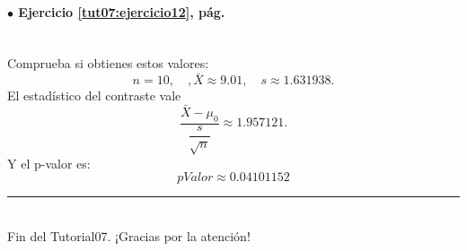 \documentclass[10pt,a4paper]{article}\usepackage[]{graphicx}\usepackage[]{color}
\newcounter {cont01}
\begin{document}
\paragraph{\bf $\bullet$ Ejercicio \ref{tut07:ejercicio12}, pág. \pageref{tut07:ejercicio12}}
\label{tut07:ejercicio12:sol}\quad\\

Comprueba si obtienes estos valores:
\[n=10, \quad, \bar X\approx 9.01,\quad s\approx 1.631938.\]
El estadístico del contraste vale
\[\dfrac{\bar X-\mu_0}{\dfrac{s}{\sqrt{n}}}\approx 1.957121.\]
Y el p-valor es:
\[pValor\approx 0.04101152\]



%
%





\vspace{2cm} \hrule
\quad\\
Fin del Tutorial07. ¡Gracias por la atención!

%
\end{document}
